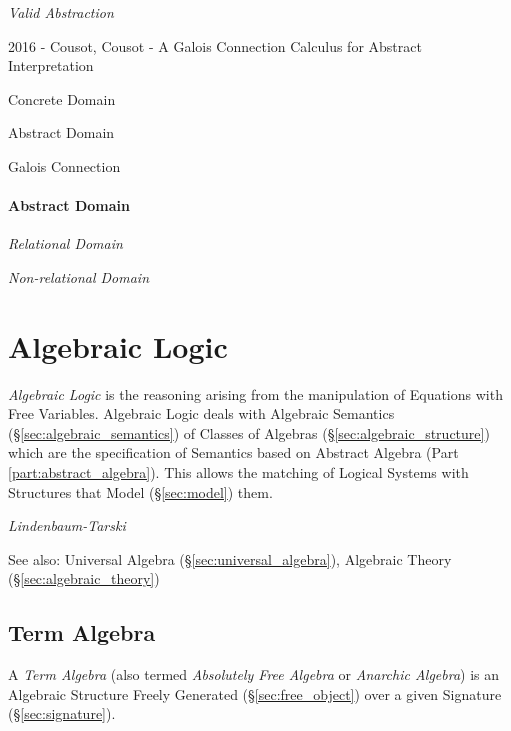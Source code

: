 \emph{Valid Abstraction}

2016 - Cousot, Cousot - A Galois Connection Calculus for Abstract
Interpretation %

Concrete Domain

Abstract Domain

Galois Connection



\paragraph{Abstract Domain}\label{sec:abstract_domain}\hfill

\emph{Relational Domain}

\emph{Non-relational Domain}



\section{Algebraic Logic}\label{sec:algebraic_logic}

\emph{Algebraic Logic} is the reasoning arising from the manipulation
of Equations with Free Variables. Algebraic Logic deals with Algebraic
Semantics (\S\ref{sec:algebraic_semantics}) of Classes of Algebras
(\S\ref{sec:algebraic_structure}) which are the specification of
Semantics based on Abstract Algebra (Part
\ref{part:abstract_algebra}). This allows the matching of Logical
Systems with Structures that Model (\S\ref{sec:model}) them.

\emph{Lindenbaum-Tarski}

\fist See also: Universal Algebra
(\S\ref{sec:universal_algebra}), Algebraic Theory
(\S\ref{sec:algebraic_theory})



\subsection{Term Algebra}\label{sec:term_algebra}

A \emph{Term Algebra} (also termed \emph{Absolutely Free Algebra} or
\emph{Anarchic Algebra}) is an Algebraic Structure Freely Generated
(\S\ref{sec:free_object}) over a given Signature
(\S\ref{sec:signature}).

